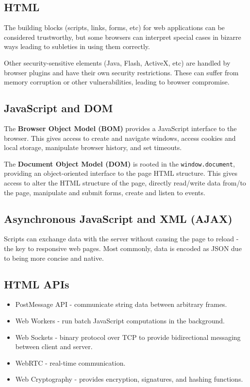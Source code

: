\documentclass[11pt]{article}
\begin{document}
\subsection{HTML}
The building blocks (scripts, links, forms, etc) for web applications can be considered trustworthy, but some browsers can interpret special cases in bizarre ways leading to subleties in using them correctly.

Other security-sensitive elements (Java, Flash, ActiveX, etc) are handled by browser plugins and have their own security restrictions.
These can suffer from memory corruption or other vulnerabilities, leading to browser compromise.

\subsection{JavaScript and DOM}
The \textbf{Browser Object Model (BOM)} provides a JavaScript interface to the browser.
This gives access to create and navigate windows, access cookies and local storage, manipulate browser history, and set timeouts.

The \textbf{Document Object Model (DOM)} is rooted in the \texttt{window.document}, providing an object-oriented interface to the page HTML structure.
This gives access to alter the HTML structure of the page, directly read/write data from/to the page, manipulate and submit forms, create and listen to events.

\subsection{Asynchronous JavaScript and XML (AJAX)}
Scripts can exchange data with the server without causing the page to reload - the key to responsive web pages.
Most commonly, data is encoded as JSON due to being more concise and native.

\subsection{HTML APIs}
\begin{itemize}
  \item PostMessage API - communicate string data between arbitrary frames.
  \item Web Workers - run batch JavaScript computations in the background.
  \item Web Sockets - binary protocol over TCP to provide bidirectional messaging between client and server.
  \item WebRTC - real-time communication.
  \item Web Cryptography - provides encryption, signatures, and hashing functions.
\end{itemize}
\end{document}
